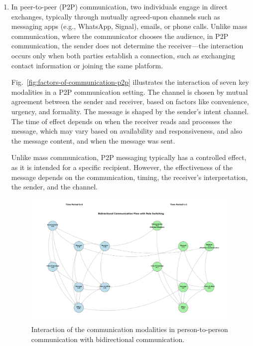 \begin{enumerate}
\item In peer-to-peer (P2P) communication, two individuals engage in direct exchanges, typically through mutually agreed-upon channels such as messaging apps (e.g., WhatsApp, Signal), emails, or phone calls. Unlike mass communication, where the communicator chooses the audience, in P2P communication, the sender does not determine the receiver—the interaction occurs only when both parties establish a connection, such as exchanging contact information or joining the same platform.

Fig.~\ref{fig:factors-of-communication-p2p} illustrates the interaction of seven key modalities in a P2P communication setting. The channel is chosen by mutual agreement between the sender and receiver, based on factors like convenience, urgency, and formality. The message is shaped by the sender’s intent channel. The time of effect depends on when the receiver reads and processes the message, which may vary based on availability and responsiveness, and also the message content, and when the message was sent.

Unlike mass communication, P2P messaging typically has a controlled effect, as it is intended for a specific recipient. However, the effectiveness of the message depends on the communication, timing, the receiver’s interpretation, the sender, and the channel. 



\begin{figure}[!t]
    \centering
    \includegraphics[width=1.0\textwidth]{images/pgm_bidirectional_communication.png}
    \caption{Interaction of the communication modalities in person-to-person communication with bidirectional communication. 
    \label{fig:factors-of-communication-p2p-biderctional}}
  \end{figure}



\end{enumerate}
